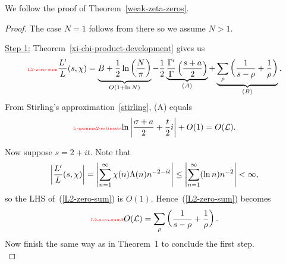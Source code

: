 We follow the proof of Theorem~\ref{weak-zeta-zeros}. 
\begin{proof}
The case $N=1$ follows from there so we assume $N>1$. 

\noindent\underline{Step 1:}
Theorem~\ref{xi-chi-product-development} gives us
\begin{equation}\llabel{L2-zero-sum}
\frac{L'}{L}(s,\chi)=
\underbrace{B+\rc2\ln\pf{N}{\pi}}_{O(1+\ln N)}
-
\rc2\underbrace{\frac{\Ga'}{\Ga}\pa{
\frac {s+a}2}}_{(A)}+
\underbrace{\sum_{\rh} \pa{\rc{
s-\rh}+\rc{\rh}}}_{(B)}.
\end{equation}
From Stirling's approximation~\ref{stirling}, (A) equals
\begin{equation}\llabel{L-gamma2-estimate}
{\ln\ab{\frac{\si+a}{2}+\frac t2i}}%
+O(1)=O(\cal L).
\end{equation}

Now suppose $s=2+it$. 
Note that
\[
\left| {\frac{L'}{L}(s,\chi)} \right|
=\left| {\sum_{n=1}^{\infty} \chi(n)\Lambda(n)n^{-2-it}} \right|
\le \left| {\sum_{n=1}^{\infty} (\ln n)n^{-2}} \right|<\infty,
\]
so the LHS of~(\ref{L2-zero-sum}) is $O(1)$.
Hence~(\ref{L2-zero-sum}) becomes
\begin{equation}\llabel{L2-zero-sum2}
O(\cal L)=\sum_{\rh} \pa{\rc{
s-\rh}+\rc{\rh}}.
\end{equation}
Now finish the same way as in Theorem~1 to conclude the first step.\\


\end{proof}
